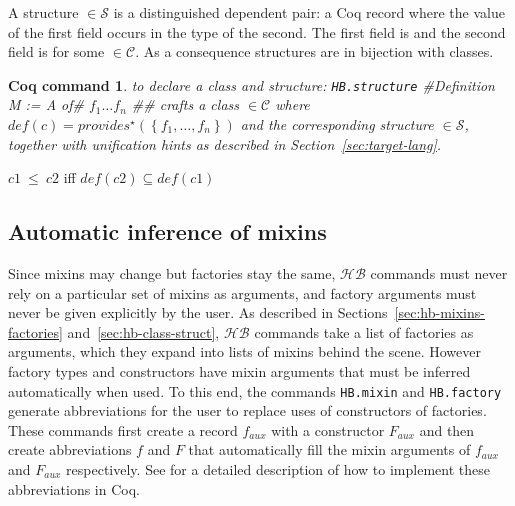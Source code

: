 \documentclass[a4paper,UKenglish,cleveref, autoref]{lipics-v2019}
\newcommand{\HB}{\ensuremath{\mathcal{HB}}}
\newcommand{\mixin}{mixin}
\newcommand{\mixins}{mixins}
\newcommand{\factory}{factory}
\newcommand{\factories}{factories}
\newcommand{\phantterms}{abbreviations}
\newcommand{\C}{\ensuremath{\mathcal{C}}}
\newcommand{\classes}{classes}
\newcommand{\cdef}{\ensuremath{\mathit{def}}}
\newcommand{\Str}{\ensuremath{\mathcal{S}}}
\newcommand{\structure}{structure}
\newcommand{\structures}{structures}
\newcommand{\issubclass}{\ensuremath{\leq}}
\newcommand{\subclass}{subclass}
\newcommand{\provides}{\ensuremath{\mathit{provides}}}
\newcommand{\set}[1]{\left\{#1\right\}}
\newcommand{\enum}[2]{\ensuremath{\set{#1,\ldots,#2}}}
\newcommand{\aux}{\mathit{aux}}
\newcommand{\hbmixin}{{\tt\color{dkgreen}HB.mixin}}
\newcommand{\hbfactory}{{\tt\color{dkgreen}HB.factory}}
\newcommand{\hbstructure}{{\tt\color{dkgreen}HB.structure}}
\theoremstyle{implem}
\theoremstyle{implem}
\theoremstyle{command}
\newtheorem*{command}{Coq command}
\theoremstyle{commands}
\begin{document}
\begin{definition}[\Str{} Structure]
A \structure{}  \(\in \Str{}\) is a distinguished dependent pair: a Coq record where
the value of the first field occurs in the type of the second.
The first field is  and the second field is
 for some  \(\in \C{}\).
As a consequence \structures{} are in bijection with \classes{}.
\end{definition}


\begin{command} to declare a class and structure:
  \hbstructure{} \coq#Definition M := { A of# \(f_1 \ldots f_n\) \coq#}#
  crafts a class  $\in \C{}$ where
  $\cdef{}(c) = \provides{}^\star\left(\enum{f_1}{f_n}\right) $ and the
  corresponding structure  $\in \Str{}$, together with
  unification hints as described in Section~\ref{sec:target-lang}.
\end{command}


\begin{definition}[\issubclass{} \(\in \C{}\times\C{}\), \subclass{}]\label{def:subclass}
  \(c1~\issubclass{}~c2\) iff \(\cdef{}(c2) \subseteq \cdef{}(c1)\)
  \end{definition}

\subsection{Automatic inference of \mixins{}}
\label{sec:autom-infer-mixins}

Since \mixins{} may change but \factories{} stay the same, \HB{}
commands must never rely on a particular set of \mixins{} as
arguments, and \factory{} arguments must never be given explicitly by
the user. As described in Sections~\ref{sec:hb-mixins-factories}
and~\ref{sec:hb-class-struct}, \HB{} commands take a list of
\factories{} as arguments, which they expand into lists of \mixins{}
behind the scene. However \factory{} types and constructors have
\mixin{} arguments that must be inferred automatically when used. To
this end, the commands \hbmixin{} and \hbfactory{} generate
\phantterms{} for the user to replace uses of constructors of \factories{}.
These commands first create a record \(f_{\aux}\) with a
constructor \(F_{\aux}\) and then create abbreviations \(f\) and \(F\)
that automatically fill the mixin arguments of \(f_{\aux}\) and \(F_{\aux}\)
respectively.
See \cite[Section 7]{DBLP:conf/itp/MahboubiT13} for a detailed description
of how to implement these abbreviations in Coq.
\end{document}
